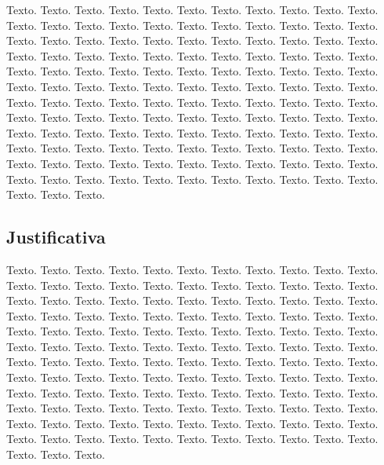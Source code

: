 \begin{onehalfspacing}
    \begin{justify}
        \begin{large}
            Texto. Texto. Texto. Texto. Texto. Texto. Texto. Texto. Texto. Texto. Texto. Texto. Texto. Texto. Texto. Texto. Texto. Texto. Texto. Texto. Texto. Texto. Texto. Texto. Texto. Texto. Texto. Texto. Texto. Texto. Texto. Texto. Texto. Texto. Texto. Texto. Texto. Texto. Texto. Texto. Texto. Texto. Texto. Texto. Texto. Texto. Texto. Texto. Texto. Texto. Texto. Texto. Texto. Texto. Texto. Texto. Texto. Texto. Texto. Texto. Texto. Texto. Texto. Texto. Texto. Texto. Texto. Texto. Texto. Texto. Texto. Texto. Texto. Texto. Texto. Texto. Texto. Texto. Texto. Texto. Texto. Texto. Texto. Texto. Texto. Texto. Texto. Texto. Texto. Texto. Texto. Texto. Texto. Texto. Texto. Texto. Texto. Texto. Texto. Texto. Texto. Texto. Texto. Texto. Texto. Texto. Texto. Texto. Texto. Texto. Texto. Texto. Texto. Texto. Texto. Texto. Texto. Texto. Texto. Texto. Texto. Texto. Texto. Texto. Texto. Texto. Texto. Texto. Texto. Texto. Texto. Texto. Texto. Texto. Texto.
        \end{large}
    \end{justify}
\end{onehalfspacing}\pagebreak

    \subsection{Justificativa}
    
\begin{onehalfspacing}
    \begin{justify}
        \begin{large}
            Texto. Texto. Texto. Texto. Texto. Texto. Texto. Texto. Texto. Texto. Texto. Texto. Texto. Texto. Texto. Texto. Texto. Texto. Texto. Texto. Texto. Texto. Texto. Texto. Texto. Texto. Texto. Texto. Texto. Texto. Texto. Texto. Texto. Texto. Texto. Texto. Texto. Texto. Texto. Texto. Texto. Texto. Texto. Texto. Texto. Texto. Texto. Texto. Texto. Texto. Texto. Texto. Texto. Texto. Texto. Texto. Texto. Texto. Texto. Texto. Texto. Texto. Texto. Texto. Texto. Texto. Texto. Texto. Texto. Texto. Texto. Texto. Texto. Texto. Texto. Texto. Texto. Texto. Texto. Texto. Texto. Texto. Texto. Texto. Texto. Texto. Texto. Texto. Texto. Texto. Texto. Texto. Texto. Texto. Texto. Texto. Texto. Texto. Texto. Texto. Texto. Texto. Texto. Texto. Texto. Texto. Texto. Texto. Texto. Texto. Texto. Texto. Texto. Texto. Texto. Texto. Texto. Texto. Texto. Texto. Texto. Texto. Texto. Texto. Texto. Texto. Texto. Texto. Texto. Texto. Texto. Texto. Texto. Texto. Texto.
        \end{large}
    \end{justify}
\end{onehalfspacing}

